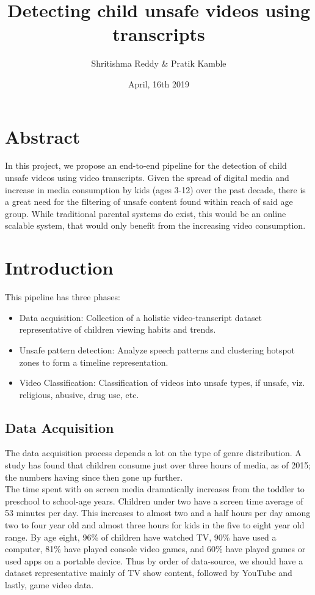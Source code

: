 \documentclass{article}[A4]
\title{Detecting child unsafe videos using transcripts}
\author{Shritishma Reddy \& Pratik Kamble}
\date{April, 16th 2019}
\begin{document}
\maketitle

\section{Abstract}

In this project, we propose an end-to-end pipeline for the detection of child unsafe videos
using video transcripts. Given the spread of digital media and increase in media consumption
by kids (ages 3-12) over the past decade, there is a great need for the filtering of unsafe
content found within reach of said age group. While traditional parental systems do exist,
this would be an online scalable system, that would  only benefit from the increasing video
consumption.

\section{Introduction}

This pipeline has three phases:
\begin{itemize}
    \item{Data acquisition: Collection of a holistic video-transcript dataset representative
    of children viewing habits and trends.}
    \item{Unsafe pattern detection: Analyze speech patterns and clustering hotspot zones to
    form a timeline representation.}
    \item{Video Classification: Classification of videos into unsafe types,
    if unsafe, viz. religious, abusive, drug use, etc.}
\end{itemize}

\subsection{Data Acquisition}

The data acquisition process depends a lot on the type of genre distribution.
A study \citep{childtime} has found that  children consume just over three hours of media,
as of 2015; the numbers having since then gone up further. \\

The time spent with on screen media dramatically increases from the toddler to preschool to
school-age years. Children under two have a screen time average of 53 minutes per day.
This increases to almost two and a half hours per day among two to four year old and almost
three hours for kids in the five to eight year old range. By age eight, 96\% of children have
watched TV, 90\% have used a computer, 81\% have played console video games, and 60\% have
played games or used apps on a portable device. Thus by order of data-source, we should have
a dataset representative mainly of TV show content, followed by YouTube and lastly, game video data. \\
\end{document}
